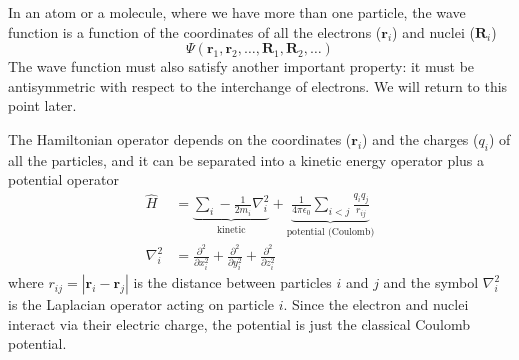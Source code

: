 \documentclass[../Main/notes.tex]{subfiles}
\begin{document}
In an atom or a molecule, where we have more than one particle, the wave function is a function of the coordinates of all the electrons ($\mathbf{r}_i$) and nuclei ($\mathbf{R}_i$)
\begin{equation}
\Psi(\mathbf{r}_1, \mathbf{r}_2, \ldots, \mathbf{R}_1,  \mathbf{R}_2,\ldots)
\end{equation}
The wave function must also satisfy another important property: it must be antisymmetric with respect to the interchange of electrons. We will return to this point later.

The Hamiltonian operator depends on the coordinates ($\mathbf{r}_i$) and the charges ($q_i$) of all the particles, and it can be separated into a kinetic energy operator plus a potential operator
\begin{align}
\hat{H} & =
\underbrace{
\sum_i -\frac{1}{2 m_i} \nabla^2_i
}_{\text{kinetic}}
+
\underbrace{
\frac{1}{4\pi \epsilon_0} \sum_{i < j} \frac{q_i q_j}{r_{ij}}
}_{\text{potential (Coulomb)}}  
\\
\nabla^2_i & = \frac{\partial^2}{\partial x_i^2} +  \frac{\partial^2}{\partial y_i^2} +  \frac{\partial^2}{\partial z_i^2}
\end{align}
where $r_{ij} = |\mathbf{r}_i - \mathbf{r}_j|$ is the distance between particles $i$ and $j$ and the symbol $\nabla^2_i$ is the Laplacian operator acting on particle $i$.
Since the electron and nuclei interact via their electric charge, the potential is just the classical Coulomb potential.

\end{document}
